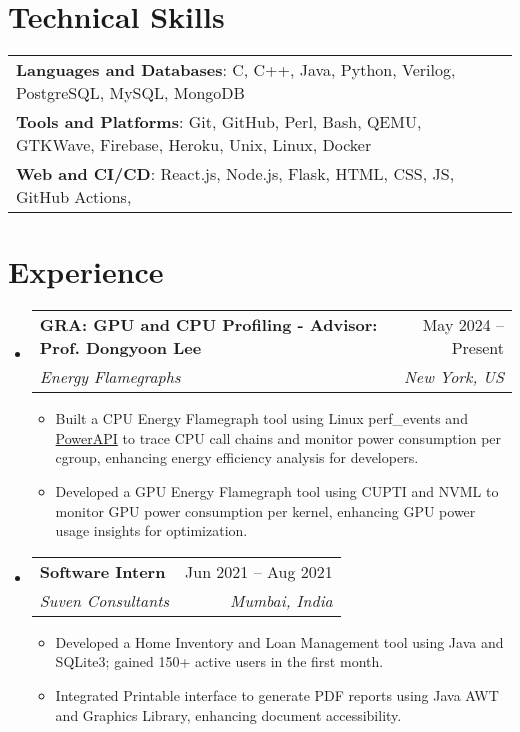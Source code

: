 \documentclass[letterpaper,11pt]{article}
\makeatletter
\newcommand{\resumeItem}[1]{
  \item\small{
    {#1 \vspace{-2pt}}
  }
}
\newcommand{\resumeSubheading}[4]{
  \vspace{-2pt}\item
    \begin{tabular*}{1.0\textwidth}[t]{l@{\extracolsep{\fill}}r}
      \vspace{-2pt}\textbf{#1} & \small #2 \\
      \textit{\small#3} & \textit{\small #4} \\
    \end{tabular*}\vspace{-7pt}
}
\newcommand{\resumeSubHeadingListStart}{\begin{itemize}[leftmargin=0.0in, label={}]}
\newcommand{\resumeSubHeadingListEnd}{\end{itemize}}
\newcommand{\resumeItemListStart}{\begin{itemize}}
\newcommand{\resumeItemListEnd}{\end{itemize}\vspace{-5pt}}
\makeatother
\begin{document}
\section{Technical Skills}
\begin{itemize}[leftmargin=0.2in, label={}]
  {\item{
        \begin{tabular}{ l@{\hskip 0.2in} l }
          \textbf{Languages and Databases}: C, C++, Java, Python, Verilog, PostgreSQL, MySQL, MongoDB                 \\
          \textbf{Tools and Platforms}: Git, GitHub, Perl, Bash, QEMU, GTKWave, Firebase, Heroku, Unix, Linux, Docker \\
          \textbf{Web and CI/CD}: React.js, Node.js, Flask, HTML, CSS, JS, GitHub Actions,
        \end{tabular}
        }}
\end{itemize}
\vspace{-18pt}

\section{Experience}
\resumeSubHeadingListStart

\resumeSubheading
{GRA: GPU and CPU Profiling - Advisor: Prof. Dongyoon Lee}{May 2024 -- Present}
{Energy Flamegraphs}{New York, US}
\resumeItemListStart
\resumeItem{
  Built a CPU Energy Flamegraph tool using Linux perf\_events and \href{https://powerapi.org/}{PowerAPI} to trace CPU call chains and monitor power consumption per cgroup, enhancing energy efficiency analysis for developers.
}
\resumeItem{
  Developed a GPU Energy Flamegraph tool using CUPTI and NVML to monitor GPU power consumption per kernel, enhancing GPU power usage insights for optimization.
}
\resumeItemListEnd
\vspace{-3pt}

\resumeSubheading
{Software Intern}{Jun 2021 -- Aug 2021}
{Suven Consultants}{Mumbai, India}
\resumeItemListStart
\resumeItem{Developed a Home Inventory and Loan Management tool using Java and SQLite3; gained 150+ active users in the first month.}
\resumeItem{Integrated Printable interface to generate PDF reports using Java AWT and Graphics Library, enhancing document accessibility.}
\resumeItemListEnd
\vspace{-3pt}
\resumeSubHeadingListEnd
\end{document}

